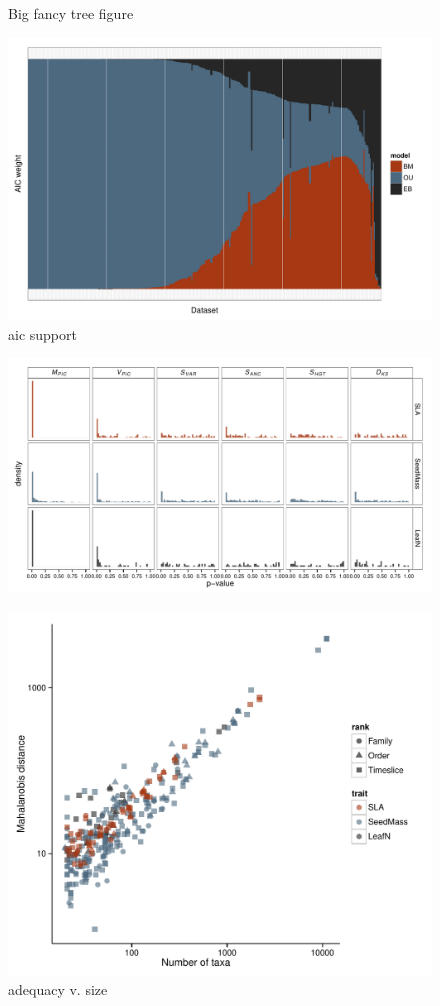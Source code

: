 \documentclass[a4paper,12pt]{article}
\begin{document}
\begin{figure}[p]
  \centering
  \caption{Big fancy tree figure}
  \label{fig:angio-phylogeny}
\end{figure}

\begin{figure}[p]
  \centering
  \includegraphics[scale=0.7]{figs/AIC-support}
  \caption{aic support}
  \label{fig:aic-support}
\end{figure}

\begin{figure}[p]
  \centering
  \includegraphics[angle=90, origin=c]{figs/pvalue-hist-ML}
  \label{fig:pvalues}
\end{figure}

\begin{figure}[p]
  \centering
  \includegraphics[scale=0.9]{figs/Size-adequacy-ML-bestonly}
  \caption{adequacy v. size}
  \label{fig:size-adequacy}
\end{figure}
\end{document}
